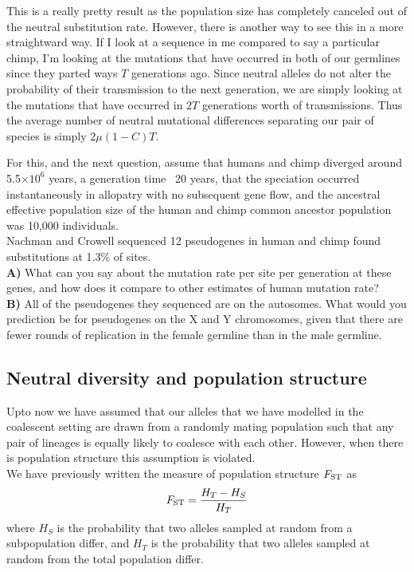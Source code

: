 This is a really pretty result as the population size has completely
canceled out of the neutral substitution rate. However, there is
another way to see this in a more straightward way. If I look at a
sequence in me compared to say a particular chimp, I'm looking at the mutations
that have occurred in both of our germlines since they parted ways $T$
generations ago. Since neutral alleles do not alter the probability
of their transmission to the next generation, we are simply looking at
the mutations that have occurred in $2T$ generations worth of
transmissions. Thus the average number of neutral mutational
differences separating our pair of species is simply $2\mu (1-C) T$.\\

\begin{question}
For this, and the next question, assume that humans and chimp diverged
around 5.5$\times 10^6$ years, a generation time ~20 years, that the speciation occurred instantaneously in allopatry with no subsequent gene flow, and the ancestral effective population size of the human and chimp common ancestor population was 10,000 individuals.\\
Nachman and Crowell sequenced 12 pseudogenes in human and chimp found substitutions at 1.3\% of sites. \\
{\bf A) } What can you say about the mutation rate per site per generation at these genes, and how does it compare to other estimates of human mutation rate?\\
{\bf B)} All of the pseudogenes they sequenced are on the autosomes. What
would you prediction be for pseudogenes on the X and Y chromosomes,
given that there are fewer rounds of replication in the female
germline than in the male germline.
\end{question}




\subsection{Neutral diversity and population structure}
Upto now we have assumed that our alleles that we have modelled in the
coalescent setting are drawn from a randomly mating population such
that any pair of lineages is equally likely to coalesce with each
other. However, when there is population structure this assumption is
violated. \\

We have previously written the measure of population structure
$F_{\mathrm{ST}}$ as
\begin{equation}
F_{\mathrm{ST}} = \frac{H_T-H_S}{H_T}
\end{equation}
where $H_S$ is the probability that two alleles sampled at random from a
subpopulation differ, and $H_T$ is the probability that two alleles
sampled at random from the total population differ. 

